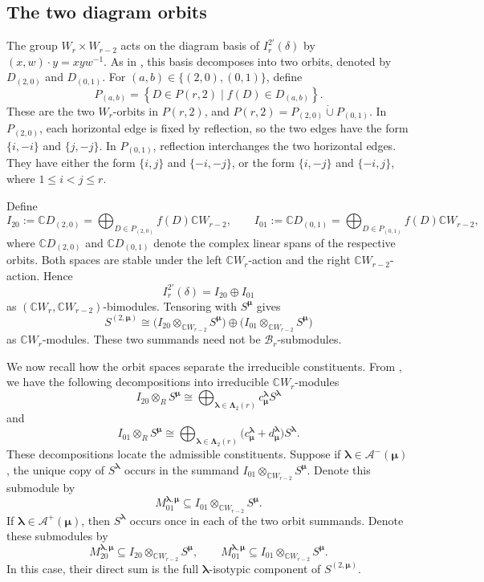 \documentclass[10pt,a4paper]{amsart}
\newcommand{\C}{\mathbb{C}}
\newcommand{\1}{\mathfrak{1}}
\newcommand{\B}{\mathcal{B}}
\begin{document}
\subsection{The two diagram orbits}

The group $W_r\times W_{r-2}$ acts on the diagram basis of
$I_r^{2'}(\delta)$ by $(x,w)\cdot y=xyw^{-1}$. As in \cite[Section~3]{KCTprevious}, this basis decomposes
into two orbits, denoted by $D_{(2,0)}$ and $D_{(0,1)}$.
For $(a,b)\in\{(2,0),(0,1)\}$, define
$$
P_{(a,b)}
=\left\{
D\in P(r,2)\mid f(D)\in D_{(a,b)}
\right\}.
$$
These are the two $W_r$-orbits in $P(r,2)$, and
$P(r,2)=P_{(2,0)}\mathbin{\dot\cup}P_{(0,1)}$. In $P_{(2,0)}$, each horizontal edge is fixed by reflection,
so the two edges have the form $\{i,-i\}$ and $\{j,-j\}$.
In $P_{(0,1)}$, reflection interchanges the two horizontal
edges. They have either the form $\{i,j\}$ and $\{-i,-j\}$,
or the form $\{i,-j\}$ and $\{-i,j\}$, where
$1\leq i<j\leq r$.

Define
$$
I_{20}:=\C D_{(2,0)}
=\bigoplus_{D\in P_{(2,0)}}f(D)\C W_{r-2},
\qquad
I_{01}:=\C D_{(0,1)}
=\bigoplus_{D\in P_{(0,1)}}f(D)\C W_{r-2},
$$
where $\C D_{(2,0)}$ and $\C D_{(0,1)}$ denote the complex
linear spans of the respective orbits. Both spaces are stable
under the left $\C W_r$-action and the right
$\C W_{r-2}$-action. Hence
$$
I_r^{2'}(\delta)=I_{20}\oplus I_{01}
$$
as $(\C W_r,\C W_{r-2})$-bimodules. Tensoring with
$S^{\bm\mu}$ gives
$$
S^{(2,\bm\mu)}
\cong
\bigl(I_{20}\otimes_{\C W_{r-2}}S^{\bm\mu}\bigr)
\oplus
\bigl(I_{01}\otimes_{\C W_{r-2}}S^{\bm\mu}\bigr)
$$
as $\C W_r$-modules. These two summands need not be
$\B_r$-submodules.

We now recall how the orbit spaces separate the irreducible constituents. From \cite[Section~3]{KCTprevious}, we have the following
decompositions into irreducible $\C W_r$-modules
$$
I_{20}\otimes_R S^{\bm\mu}\cong
\bigoplus_{\bm\lambda\in\bm\Lambda_2(r)}
c_{\bm\mu}^{\bm\lambda}S^{\bm\lambda}
$$
and
$$
I_{01}\otimes_R S^{\bm\mu}\cong
\bigoplus_{\bm\lambda\in\bm\Lambda_2(r)}
\bigl(c_{\bm\mu}^{\bm\lambda}
+d_{\bm\mu}^{\bm\lambda}\bigr)S^{\bm\lambda}.
$$
These decompositions locate the admissible constituents. Suppose if $\bm\lambda\in\mathcal A^-(\bm\mu)$,
the unique copy of $S^{\bm\lambda}$ occurs in the summand $I_{01}\otimes_{\C W_{r-2}}S^{\bm\mu}$.
Denote this submodule by
$$
M_{01}^{\bm\lambda,\bm\mu}
\subseteq I_{01}\otimes_{\C W_{r-2}} S^{\bm\mu}.
$$
If $\bm\lambda\in\mathcal A^+(\bm\mu)$, then $S^{\bm\lambda}$ occurs once in each of the two orbit summands. Denote these submodules by
$$
M_{20}^{\bm\lambda,\bm\mu}
\subseteq I_{20}\otimes_{\C W_{r-2}} S^{\bm\mu},
\qquad
M_{01}^{\bm\lambda,\bm\mu}
\subseteq I_{01}\otimes_{\C W_{r-2}} S^{\bm\mu}.
$$
In this case, their direct sum is the full $\bm\lambda$-isotypic component of $S^{(2,\bm\mu)}$.
\end{document}
